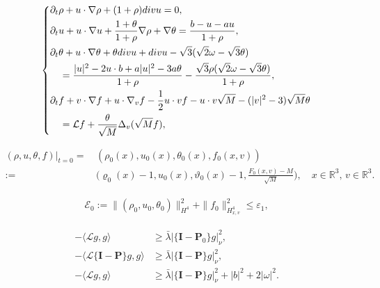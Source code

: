 \documentclass[10pt,a4paper]{amsart}
\newcommand{\eps}{{\varepsilon}}
\begin{document}
\begin{equation}\label{Q2}
\left\{\begin{aligned}
&\partial_t \rho + u\cdot\nabla\rho+(1+\rho){\rm div} u=0, \\
&\partial_t u +u \cdot \nabla u+\frac{1+\theta}{1+\rho} \nabla 
\rho+\nabla \theta=\frac{b-u-au}{1+\rho}, \\
&\partial_t \theta +u \cdot \nabla \theta+\theta  {\rm div} u
+ {\rm div} u-\sqrt{3}(\sqrt{2} \omega-\sqrt{3} \theta)  \\
&\quad =\frac{ |u|^2-2 u \cdot b+a|u|^2-3 a \theta }{1+\rho}  
 -\frac{\sqrt{3}\rho(\sqrt{2} \omega-\sqrt{3} \theta)}{1+\rho},\\
&\partial_t f +v \cdot \nabla f+u \cdot \nabla_v f-\frac{1}{2} u \cdot v f-
u \cdot v \sqrt{M}- (|v|^2-3 ) \sqrt{M} \theta  \\
&\quad =\mathcal{L} f+\frac{\theta}{\sqrt{M}} \Delta_v(\sqrt{M} f),\\
\end{aligned}\right.
\end{equation} 

\begin{align}\label{Q2-2}
(\rho ,u ,\theta ,f )|_{t=0}=&\,(\rho _0(x),u _0(x),\theta _0(x),f _0(x,v))\nonumber\\
:=&\,\Big( \varrho_0 (x)-1,u _0(x), {\vartheta} _0(x)-1,\frac{F _0(x,v)-M}{\sqrt{M}}\Big),
 \quad   x \in \mathbb{R}^3, \, v\in\mathbb{R}^3.  \quad
\end{align}

\begin{align}\label{b-1}
\mathcal{E}_0:=\|(\rho _0,u _0,\theta _0 )\|_{H^4}^2+\|f_0 \|_{H_{x,v}^4}^2\leq \eps_1,
\end{align}

\begin{align} 
-\langle \mathcal{L}g, g\rangle &\geq \bar\lambda|\{\mathbf{I}-\mathbf{P}_0\}g|_{\nu}^{2}, \label{G2.6a}  \\  
-\langle \mathcal{L}\{\mathbf{I}-\mathbf{P}\}g,g\rangle &\geq \bar\lambda|\{\mathbf{I}-\mathbf{P}\}g|_{\nu}^{2}, \label{G2.6b}  \\  
-\langle \mathcal{L}g, g\rangle &\geq \bar\lambda |\{\mathbf{I}-\mathbf{P}\}g|_{\nu}^{2} + |b|^{2} + 2|\omega|^2.\label{G2.6}  
\end{align}
\end{document}

